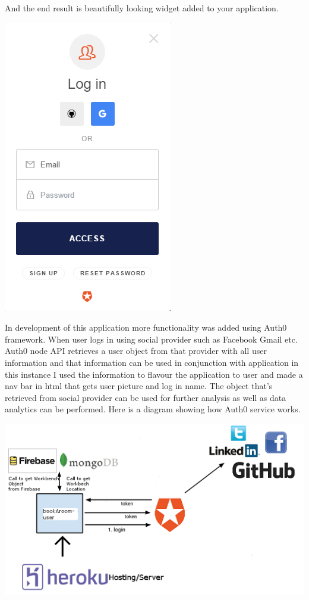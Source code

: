\begin{itemize}
\begin{verbatim}
\end{verbatim}
And the end result is beautifully looking widget added to your application.
\begin{center}    
	\includegraphics{img/Widget.png}
\end{center}
In development of this application more functionality was added using Auth0 framework. When user logs in using social provider such as Facebook Gmail etc. Auth0 node API retrieves a user object from that provider with all user information and that information can be used in conjunction with application in this instance I used the information to flavour the application to user and made a nav bar in html that gets user picture and log in name. The object that’s retrieved from social provider can be used for further analysis as well as data analytics can be performed. Here is a diagram showing how Auth0 service works.
\begin{center}    
	\includegraphics{img/userFlow.png}
\end{center}




\end{itemize}
